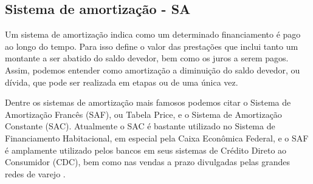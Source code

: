 \subsection{Sistema de amortização - SA}

Um sistema de amortização indica como um determinado financiamento é pago ao longo do tempo. Para isso define o valor das prestações que inclui tanto um montante a ser abatido do saldo devedor, bem como os juros a serem pagos. Assim, podemos entender como amortização a diminuição do saldo devedor, ou dívida, que pode ser realizada em etapas ou de uma única vez.

Dentre os sistemas de amortização mais famosos podemos citar o Sistema de Amortização Francês (SAF), ou Tabela Price, e o Sistema de Amortização Constante (SAC). Atualmente o SAC é bastante utilizado no Sistema de Financiamento Habitacional, em especial pela Caixa Econômica Federal, e o SAF é amplamente utilizado pelos bancos em seus sistemas de Crédito Direto ao Consumidor (CDC), bem como nas vendas a prazo divulgadas pelas grandes redes de varejo \cite{usoSACSAF}.

